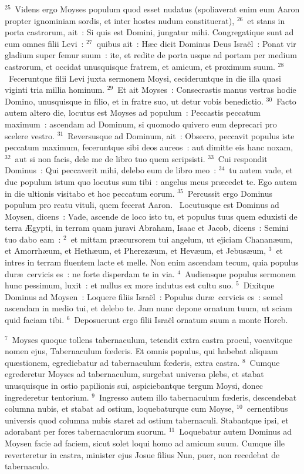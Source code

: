 ${}^{25}$~Videns ergo Moyses populum quod esset nudatus (spoliaverat enim eum Aaron propter ignominiam sordis, et inter hostes nudum constituerat),
${}^{26}$~et stans in porta castrorum, ait~: Si quis est Domini, jungatur mihi. Congregatique sunt ad eum omnes filii Levi~:
${}^{27}$~quibus ait~: H\ae c dicit Dominus Deus Isra\"el~: Ponat vir gladium super femur suum~: ite, et redite de porta usque ad portam per medium castrorum, et occidat unusquisque fratrem, et amicum, et proximum suum.
${}^{28}$~Feceruntque filii Levi juxta sermonem Moysi, cecideruntque in die illa quasi viginti tria millia hominum.
${}^{29}$~Et ait Moyses~: Consecrastis manus vestras hodie Domino, unusquisque in filio, et in fratre suo, ut detur vobis benedictio.
${}^{30}$~Facto autem altero die, locutus est Moyses ad populum~: Peccastis peccatum maximum~: ascendam ad Dominum, si quomodo quivero eum deprecari pro scelere vestro.
${}^{31}$~Reversusque ad Dominum, ait~: Obsecro, peccavit populus iste peccatum maximum, feceruntque sibi deos aureos~: aut dimitte eis hanc noxam,
${}^{32}$~aut si non facis, dele me de libro tuo quem scripsisti.
${}^{33}$~Cui respondit Dominus~: Qui peccaverit mihi, delebo eum de libro meo~:
${}^{34}$~tu autem vade, et duc populum istum quo locutus sum tibi~: angelus meus pr\ae cedet te. Ego autem in die ultionis visitabo et hoc peccatum eorum.
${}^{35}$~Percussit ergo Dominus populum pro reatu vituli, quem fecerat Aaron.
~\lettrine[lines=10,image=true,loversize=0.05,lraise=-0.03]{L}{}ocutusque est Dominus ad Moysen, dicens~: Vade, ascende de loco isto tu, et populus tuus quem eduxisti de terra \AE gypti, in terram quam juravi Abraham, Isaac et Jacob, dicens~: Semini tuo dabo eam~:
${}^{2}$~et mittam pr\ae cursorem tui angelum, ut ejiciam Chanan\ae um, et Amorrh\ae um, et Heth\ae um, et Pherez\ae um, et Hev\ae um, et Jebus\ae um,
${}^{3}$~et intres in terram fluentem lacte et melle. Non enim ascendam tecum, quia populus dur\ae\ cervicis es~: ne forte disperdam te in via.
${}^{4}$~Audiensque populus sermonem hunc pessimum, luxit~: et nullus ex more indutus est cultu suo.
${}^{5}$~Dixitque Dominus ad Moysen~: Loquere filiis Isra\"el~: Populus dur\ae\ cervicis es~: semel ascendam in medio tui, et delebo te. Jam nunc depone ornatum tuum, ut sciam quid faciam tibi.
${}^{6}$~Deposuerunt ergo filii Isra\"el ornatum suum a monte Horeb.


${}^{7}$~Moyses quoque tollens tabernaculum, tetendit extra castra procul, vocavitque nomen ejus, Tabernaculum fœderis. Et omnis populus, qui habebat aliquam qu\ae stionem, egrediebatur ad tabernaculum fœderis, extra castra.
${}^{8}$~Cumque egrederetur Moyses ad tabernaculum, surgebat universa plebs, et stabat unusquisque in ostio papilionis sui, aspiciebantque tergum Moysi, donec ingrederetur tentorium.
${}^{9}$~Ingresso autem illo tabernaculum fœderis, descendebat columna nubis, et stabat ad ostium, loquebaturque cum Moyse,
${}^{10}$~cernentibus universis quod columna nubis staret ad ostium tabernaculi. Stabantque ipsi, et adorabant per fores tabernaculorum suorum.
${}^{11}$~Loquebatur autem Dominus ad Moysen facie ad faciem, sicut solet loqui homo ad amicum suum. Cumque ille reverteretur in castra, minister ejus Josue filius Nun, puer, non recedebat de tabernaculo.


